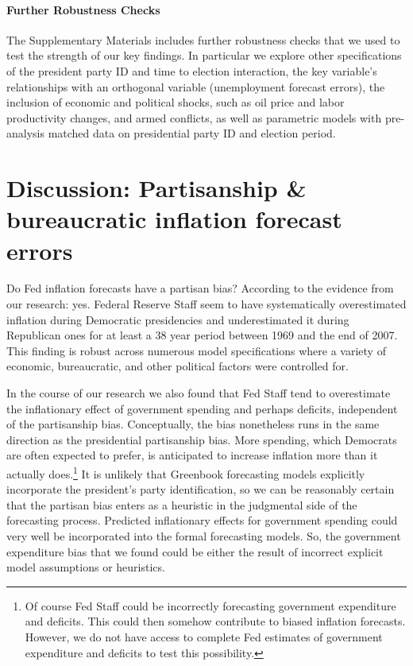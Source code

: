 \documentclass[a4paper]{article}
\begin{document}
\paragraph{Further Robustness Checks}

The Supplementary Materials includes further robustness checks that we used to test the strength of our key findings. In particular we explore other specifications of the president party ID and time to election interaction, the key variable's relationships with an orthogonal variable (unemployment forecast errors), the inclusion of economic and political shocks, such as oil price and labor productivity changes, and armed conflicts, as well as parametric models with pre-analysis matched data on presidential party ID and election period.

\section*{Discussion: Partisanship \& bureaucratic inflation forecast errors}

Do Fed inflation forecasts have a partisan bias? According to the evidence from our research: yes. Federal Reserve Staff seem to have systematically overestimated inflation during Democratic presidencies and underestimated it during Republican ones for at least a 38 year period between 1969 and the end of 2007. This finding is robust across numerous model specifications where a variety of economic, bureaucratic, and other political factors were controlled for.

In the course of our research we also found that Fed Staff tend to overestimate the inflationary effect of government spending and perhaps deficits, independent of the partisanship bias. Conceptually, the bias nonetheless runs in the same direction as the presidential partisanship bias. More spending, which Democrats are often expected to prefer, is anticipated to increase inflation more than it actually does.\footnote{Of course Fed Staff could be incorrectly forecasting government expenditure and deficits. This could then somehow contribute to biased inflation forecasts. However, we do not have access to complete Fed estimates of government expenditure and deficits to test this possibility.} It is unlikely that Greenbook forecasting models explicitly incorporate the president's party identification, so we can be reasonably certain that the partisan bias enters as a heuristic in the judgmental side of the forecasting process. Predicted inflationary effects for government spending could very well be incorporated into the formal forecasting models. So, the government expenditure bias that we found could be either the result of incorrect explicit model assumptions or heuristics.
\end{document}
